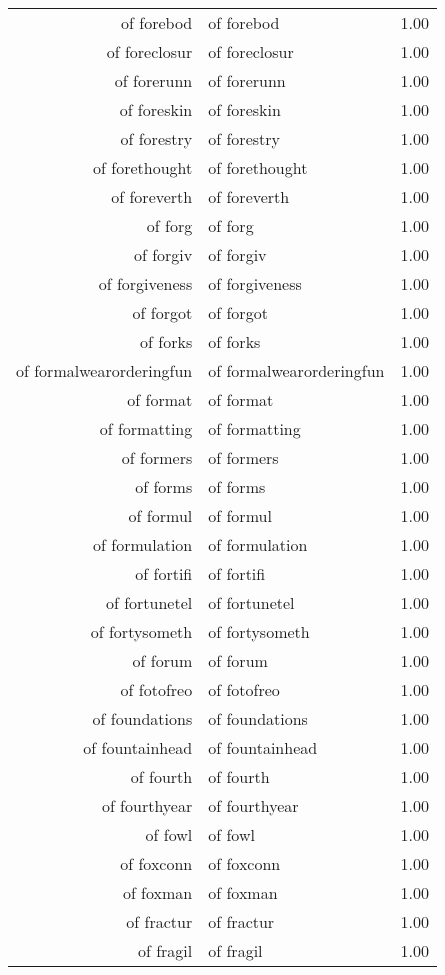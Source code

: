 \begin{table}[ht]
\begin{tabular}{rlr}
  of forebod & of forebod & 1.00 \\ 
  of foreclosur & of foreclosur & 1.00 \\ 
  of forerunn & of forerunn & 1.00 \\ 
  of foreskin & of foreskin & 1.00 \\ 
  of forestry & of forestry & 1.00 \\ 
  of forethought & of forethought & 1.00 \\ 
  of foreverth & of foreverth & 1.00 \\ 
  of forg & of forg & 1.00 \\ 
  of forgiv & of forgiv & 1.00 \\ 
  of forgiveness & of forgiveness & 1.00 \\ 
  of forgot & of forgot & 1.00 \\ 
  of forks & of forks & 1.00 \\ 
  of formalwearorderingfun & of formalwearorderingfun & 1.00 \\ 
  of format & of format & 1.00 \\ 
  of formatting & of formatting & 1.00 \\ 
  of formers & of formers & 1.00 \\ 
  of forms & of forms & 1.00 \\ 
  of formul & of formul & 1.00 \\ 
  of formulation & of formulation & 1.00 \\ 
  of fortifi & of fortifi & 1.00 \\ 
  of fortunetel & of fortunetel & 1.00 \\ 
  of fortysometh & of fortysometh & 1.00 \\ 
  of forum & of forum & 1.00 \\ 
  of fotofreo & of fotofreo & 1.00 \\ 
  of foundations & of foundations & 1.00 \\ 
  of fountainhead & of fountainhead & 1.00 \\ 
  of fourth & of fourth & 1.00 \\ 
  of fourthyear & of fourthyear & 1.00 \\ 
  of fowl & of fowl & 1.00 \\ 
  of foxconn & of foxconn & 1.00 \\ 
  of foxman & of foxman & 1.00 \\ 
  of fractur & of fractur & 1.00 \\ 
  of fragil & of fragil & 1.00 \\ 

\end{tabular}
\end{table}
